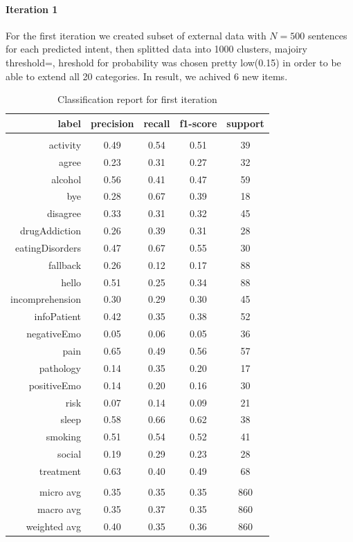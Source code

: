 \documentclass[11pt]{article}
\begin{document}
\paragraph{Iteration 1} For the first iteration we created subset of external data with $N=500$ sentences for each predicted intent, then splitted data into 1000 clusters, majoiry threshold=, hreshold for probability was chosen pretty low(0.15) in order to be able to extend all 20 categories. In result, we achived 6 new items.

\begin{table}[htb]
\begin{center}
\begin{tabular}{ |r|c|c|c|c| }
\hline
label & precision & recall & f1-score &  support\\ \hline 
\\ \hline 
activity &  0.49 & 0.54 & 0.51 &   39\\ \hline 
agree &  0.23 & 0.31 & 0.27 &   32\\ \hline 
alcohol &  0.56 & 0.41 & 0.47 &   59\\ \hline 
bye &  0.28 & 0.67 & 0.39 &   18\\ \hline 
disagree &  0.33 & 0.31 & 0.32 &   45\\ \hline 
drugAddiction &  0.26 & 0.39 & 0.31 &   28\\ \hline 
eatingDisorders &  0.47 & 0.67 & 0.55 &   30\\ \hline 
fallback &  0.26 & 0.12 & 0.17 &   88\\ \hline 
hello &  0.51 & 0.25 & 0.34 &   88\\ \hline 
incomprehension &  0.30 & 0.29 & 0.30 &   45\\ \hline 
infoPatient &  0.42 & 0.35 & 0.38 &   52\\ \hline 
negativeEmo &  0.05 & 0.06 & 0.05 &   36\\ \hline 
pain &  0.65 & 0.49 & 0.56 &   57\\ \hline 
pathology &  0.14 & 0.35 & 0.20 &   17\\ \hline 
positiveEmo &  0.14 & 0.20 & 0.16 &   30\\ \hline 
risk &  0.07 & 0.14 & 0.09 &   21\\ \hline 
sleep &  0.58 & 0.66 & 0.62 &   38\\ \hline 
smoking &  0.51 & 0.54 & 0.52 &   41\\ \hline 
social &  0.19 & 0.29 & 0.23 &   28\\ \hline 
treatment &  0.63 & 0.40 & 0.49 &   68\\ \hline 
\\ \hline 
micro avg &  0.35 & 0.35 & 0.35 &  860\\ \hline 
macro avg &  0.35 & 0.37 & 0.35 &  860\\ \hline 
weighted avg &  0.40 & 0.35 & 0.36 &  860\\ \hline 
\end{tabular}
\caption{Classification report for first iteration}
\end{center}
\end{table}
\FloatBarrier
\end{document}
